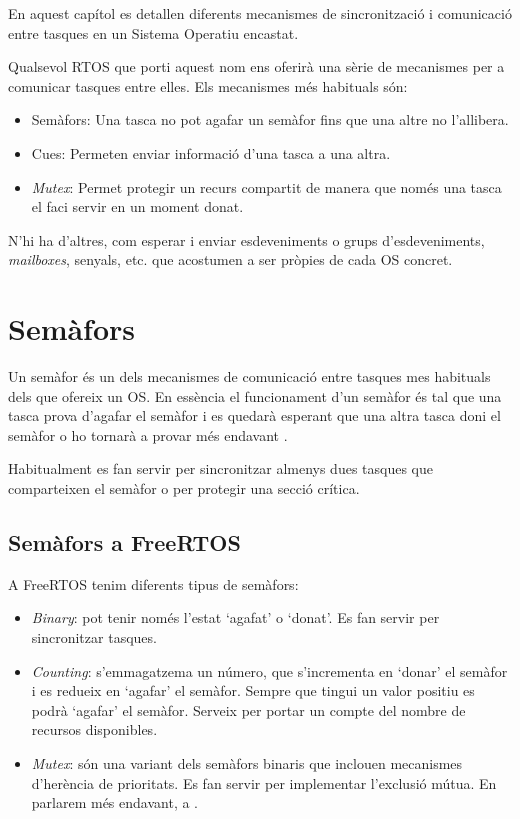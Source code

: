 En aquest capítol es detallen diferents mecanismes de sincronització i comunicació entre tasques en un Sistema Operatiu encastat.

Qualsevol RTOS que porti aquest nom ens oferirà una sèrie de mecanismes per a comunicar tasques entre elles. Els mecanismes més habituals són:
\begin{itemize}
 \item Semàfors: Una tasca no pot agafar un semàfor fins que una altre no l'allibera.
 \item Cues: Permeten enviar informació d'una tasca a una altra.
 \item {\em Mutex}: Permet protegir un recurs compartit de manera que només una tasca el faci servir en un moment donat.
\end{itemize}

N'hi ha d'altres, com esperar i enviar esdeveniments o grups d'esdeveniments, {\em mailboxes}, senyals, etc. que acostumen a ser pròpies de cada \gls{OS} concret.

\section{Semàfors}
Un semàfor és un dels mecanismes de comunicació entre tasques mes habituals dels que ofereix un OS. En essència el funcionament d'un semàfor és tal que una tasca prova d'agafar el semàfor i es quedarà esperant que una altra tasca doni el semàfor o ho tornarà a provar més endavant \cite[244]{EmbeddedDictionary} \cite[187]{programmingembedded}.

Habitualment es fan servir per sincronitzar almenys dues tasques que comparteixen el semàfor o per protegir una secció crítica.

\subsection{Semàfors a FreeRTOS}
A FreeRTOS tenim diferents tipus de semàfors:

\begin{itemize}
 \item {\em Binary}: pot tenir només l'estat ‘agafat' o ‘donat'. Es fan servir per sincronitzar tasques.
 \item {\em Counting}: s'emmagatzema un número, que s'incrementa en ‘donar' el semàfor i es redueix en ‘agafar' el semàfor. Sempre que tingui un valor positiu es podrà ‘agafar' el semàfor. Serveix per portar un compte del nombre de recursos disponibles.
 \item {\em Mutex}: són una variant dels semàfors binaris que inclouen mecanismes d'herència de prioritats. Es fan servir per implementar l'exclusió mútua. En parlarem més endavant, a .
\end{itemize}

